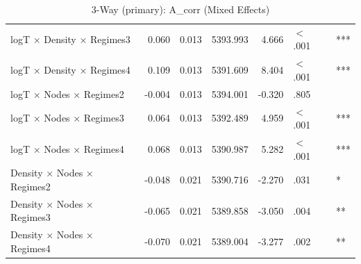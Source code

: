 \begin{table}[ht]
\begin{tabular}{lrrrrll}
  logT × Density × Regimes3 & 0.060 & 0.013 & 5393.993 & 4.666 & $<$ .001 & *** \\ 
  logT × Density × Regimes4 & 0.109 & 0.013 & 5391.609 & 8.404 & $<$ .001 & *** \\ 
  logT × Nodes × Regimes2 & -0.004 & 0.013 & 5394.001 & -0.320 & .805 &  \\ 
  logT × Nodes × Regimes3 & 0.064 & 0.013 & 5392.489 & 4.959 & $<$ .001 & *** \\ 
  logT × Nodes × Regimes4 & 0.068 & 0.013 & 5390.987 & 5.282 & $<$ .001 & *** \\ 
  Density × Nodes × Regimes2 & -0.048 & 0.021 & 5390.716 & -2.270 & .031 & * \\ 
  Density × Nodes × Regimes3 & -0.065 & 0.021 & 5389.858 & -3.050 & .004 & ** \\ 
  Density × Nodes × Regimes4 & -0.070 & 0.021 & 5389.004 & -3.277 & .002 & ** \\ 
   \hline
\end{tabular}
\caption{3-Way (primary): A_corr (Mixed Effects)} 
\end{table}
